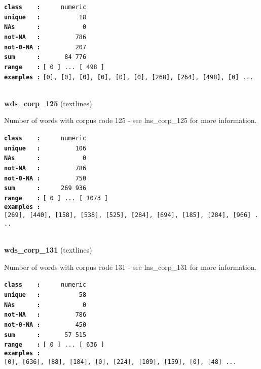 \documentclass[]{article}
\begin{document}
\textbf{\texttt{class\ \ \ \ :}} \texttt{~~~~~numeric}\\
\textbf{\texttt{unique\ \ \ :}} \texttt{~~~~~~~~~~18}\\
\textbf{\texttt{NAs\ \ \ \ \ \ :}} \texttt{~~~~~~~~~~~0}\\
\textbf{\texttt{not-NA\ \ \ :}} \texttt{~~~~~~~~~786}\\
\textbf{\texttt{not-0-NA\ :}} \texttt{~~~~~~~~~207}\\
\textbf{\texttt{sum\ \ \ \ \ \ :}} \texttt{~~~~~~84~776}\\
\textbf{\texttt{range\ \ \ \ :}}
\texttt{{[}\ 0\ {]}\ ...\ {[}\ 498\ {]}}\\
\textbf{\texttt{examples\ :}}
\texttt{{[}0{]},\ {[}0{]},\ {[}0{]},\ {[}0{]},\ {[}0{]},\ {[}0{]},\ {[}268{]},\ {[}264{]},\ {[}498{]},\ {[}0{]}\ ...}\\

~

\textbf{wds\_corp\_125} (textlines)

Number of words with corpus code 125 - see lns\_corp\_125 for more
information.

\textbf{\texttt{class\ \ \ \ :}} \texttt{~~~~~numeric}\\
\textbf{\texttt{unique\ \ \ :}} \texttt{~~~~~~~~~106}\\
\textbf{\texttt{NAs\ \ \ \ \ \ :}} \texttt{~~~~~~~~~~~0}\\
\textbf{\texttt{not-NA\ \ \ :}} \texttt{~~~~~~~~~786}\\
\textbf{\texttt{not-0-NA\ :}} \texttt{~~~~~~~~~750}\\
\textbf{\texttt{sum\ \ \ \ \ \ :}} \texttt{~~~~~269~936}\\
\textbf{\texttt{range\ \ \ \ :}}
\texttt{{[}\ 0\ {]}\ ...\ {[}\ 1073\ {]}}\\
\textbf{\texttt{examples\ :}}
\texttt{{[}269{]},\ {[}440{]},\ {[}158{]},\ {[}538{]},\ {[}525{]},\ {[}284{]},\ {[}694{]},\ {[}185{]},\ {[}284{]},\ {[}966{]}\ ...}\\

~

\textbf{wds\_corp\_131} (textlines)

Number of words with corpus code 131 - see lns\_corp\_131 for more
information.

\textbf{\texttt{class\ \ \ \ :}} \texttt{~~~~~numeric}\\
\textbf{\texttt{unique\ \ \ :}} \texttt{~~~~~~~~~~58}\\
\textbf{\texttt{NAs\ \ \ \ \ \ :}} \texttt{~~~~~~~~~~~0}\\
\textbf{\texttt{not-NA\ \ \ :}} \texttt{~~~~~~~~~786}\\
\textbf{\texttt{not-0-NA\ :}} \texttt{~~~~~~~~~450}\\
\textbf{\texttt{sum\ \ \ \ \ \ :}} \texttt{~~~~~~57~515}\\
\textbf{\texttt{range\ \ \ \ :}}
\texttt{{[}\ 0\ {]}\ ...\ {[}\ 636\ {]}}\\
\textbf{\texttt{examples\ :}}
\texttt{{[}0{]},\ {[}636{]},\ {[}88{]},\ {[}184{]},\ {[}0{]},\ {[}224{]},\ {[}109{]},\ {[}159{]},\ {[}0{]},\ {[}48{]}\ ...}\\
\end{document}
